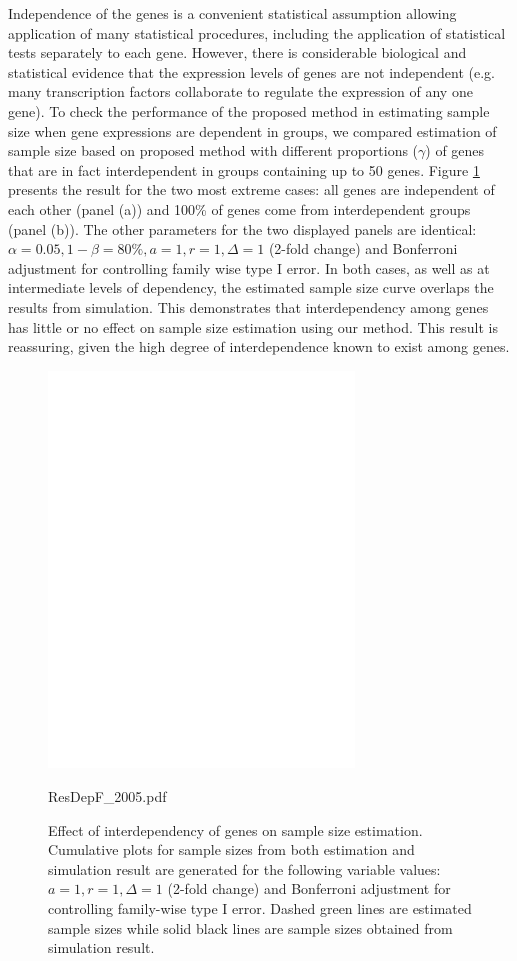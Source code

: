 \documentclass{bioinfo}
\begin{document}
Independence of the genes is a convenient statistical assumption
allowing application of many statistical procedures, including the
application of statistical tests separately to each gene. However,
there is considerable biological and statistical evidence that the
expression levels of genes are not independent (e.g. many
transcription factors collaborate to regulate the expression of any
one gene). To check the performance of the proposed method in
estimating sample size when gene expressions are dependent in
groups, we compared estimation of sample size based on proposed
method with different proportions ($\gamma$) of genes that are in
fact interdependent in groups containing up to 50 genes. Figure
\ref{fig:ResDep} presents the result for the two most extreme cases:
all genes are independent of each other (panel (a)) and 100\% of
genes come from interdependent groups (panel (b)). The other
parameters for the two displayed panels are identical: $\alpha =
0.05, 1 - \beta = 80\%, a = 1, r = 1, \Delta = 1$ (2-fold change)
and Bonferroni adjustment for controlling family wise type I
error. In both cases, as well as at intermediate levels of
dependency, the estimated sample size curve overlaps the results
from simulation.  This demonstrates that interdependency among genes
has little or no effect on sample size estimation using our
method. This result is reassuring, given the high degree of
interdependence known to exist among genes.

\begin{figure}[h]
  \centerline{\includegraphics*[width=3.2in]{ResDepF.pdf}} %
  ResDepF_2005.pdf \caption[Effect of interdependency of genes on
  sample size estimation] {Effect of interdependency of genes on
  sample size estimation.  Cumulative plots for sample sizes from
  both estimation and simulation result are generated for the
  following variable values: $a = 1, r = 1, \Delta = 1$ (2-fold
  change) and Bonferroni adjustment for controlling family-wise
  type I error. Dashed green lines are estimated sample sizes
  while solid black lines are sample sizes obtained from
  simulation result.}  \label{fig:ResDep}
\end{figure}
\end{document}
